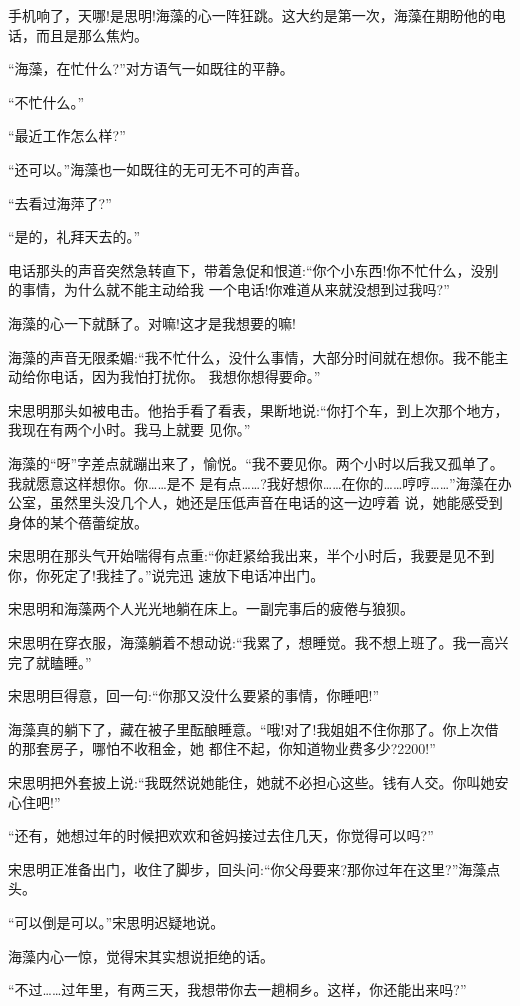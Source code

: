 \documentclass[11pt,a4paper,onecolumn]{article}
\begin{document}
手机响了，天哪!是思明!海藻的心一阵狂跳。这大约是第一次，海藻在期盼他的电话，而且是那么焦灼。

``海藻，在忙什么?''对方语气一如既往的平静。

``不忙什么。''

``最近工作怎么样?''

``还可以。''海藻也一如既往的无可无不可的声音。

``去看过海萍了?''

``是的，礼拜天去的。''

电话那头的声音突然急转直下，带着急促和恨道:``你个小东西!你不忙什么，没别的事情，为什么就不能主动给我
一个电话!你难道从来就没想到过我吗?''

海藻的心一下就酥了。对嘛!这才是我想要的嘛!

海藻的声音无限柔媚:``我不忙什么，没什么事情，大部分时间就在想你。我不能主动给你电话，因为我怕打扰你。
我想你想得要命。''

宋思明那头如被电击。他抬手看了看表，果断地说:``你打个车，到上次那个地方，我现在有两个小时。我马上就要
见你。''

海藻的``呀''字差点就蹦出来了，愉悦。``我不要见你。两个小时以后我又孤单了。我就愿意这样想你。你……是不
是有点……?我好想你……在你的……哼哼……''海藻在办公室，虽然里头没几个人，她还是压低声音在电话的这一边哼着
说，她能感受到身体的某个蓓蕾绽放。

宋思明在那头气开始喘得有点重:``你赶紧给我出来，半个小时后，我要是见不到你，你死定了!我挂了。''说完迅
速放下电话冲出门。

宋思明和海藻两个人光光地躺在床上。一副完事后的疲倦与狼狈。

宋思明在穿衣服，海藻躺着不想动说:``我累了，想睡觉。我不想上班了。我一高兴完了就瞌睡。''

宋思明巨得意，回一句:``你那又没什么要紧的事情，你睡吧!''

海藻真的躺下了，藏在被子里酝酿睡意。``哦!对了!我姐姐不住你那了。你上次借的那套房子，哪怕不收租金，她
都住不起，你知道物业费多少?2200!''

宋思明把外套披上说:``我既然说她能住，她就不必担心这些。钱有人交。你叫她安心住吧!''

``还有，她想过年的时候把欢欢和爸妈接过去住几天，你觉得可以吗?''

宋思明正准备出门，收住了脚步，回头问:``你父母要来?那你过年在这里?''海藻点头。

``可以倒是可以。''宋思明迟疑地说。

海藻内心一惊，觉得宋其实想说拒绝的话。

``不过……过年里，有两三天，我想带你去一趟桐乡。这样，你还能出来吗?''
\end{document}
